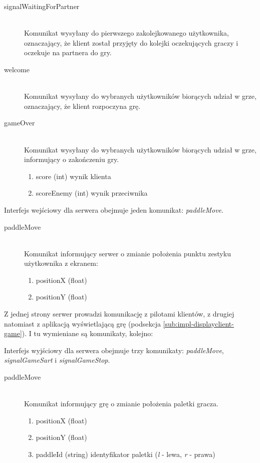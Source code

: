 \begin{description}
	\item[signalWaitingForPartner] \hfill \\
	Komunikat wysyłany do pierwszego zakolejkowanego użytkownika, oznaczający, że klient został przyjęty do kolejki oczekujących graczy i oczekuje na partnera do gry.
\end{description}

\begin{description}
	\item[welcome] \hfill \\
	Komunikat wysyłany do wybranych użytkowników biorących udział w grze, oznaczający, że klient rozpoczyna grę.
\end{description}

\begin{description}
	\item[gameOver] \hfill \\
	Komunikat wysyłany do wybranych użytkowników biorących udział w grze, informujący o zakończeniu gry.
	\begin{enumerate}
		\item score (int) wynik klienta
		\item scoreEnemy (int) wynik przeciwnika
	\end{enumerate}
\end{description}

Interfejs wejściowy dla serwera obejmuje jeden komunikat: \emph{paddleMove}.

\begin{description}
	\item[paddleMove] \hfill \\
	Komunikat informujący serwer o zmianie położenia punktu zestyku użytkownika z ekranem:
	\begin{enumerate}
		\item positionX (float)
		\item positionY (float)
	\end{enumerate}
\end{description}

Z jednej strony serwer prowadzi komunikację z pilotami klientów, z drugiej natomiast z aplikacją wyświetlającą grę (podsekcja \ref{sub:impl-displayclient-game}). I tu wymieniane są komunikaty, kolejno:

Interfejs wyjściowy dla serwera obejmuje trzy komunikaty: \emph{paddleMove}, \emph{signalGameSart} i \emph{signalGameStop}.

\begin{description}
	\item[paddleMove] \hfill \\
	Komunikat informujący grę o zmianie położenia paletki gracza.
	\begin{enumerate}
		\item positionX (float)
		\item positionY (float)
		\item paddleId (string) identyfikator paletki (\emph{l} - lewa, \emph{r} - prawa)
	\end{enumerate}
\end{description}

